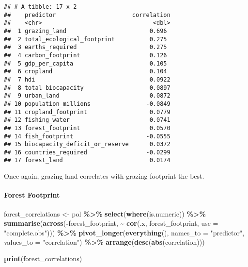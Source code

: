 \documentclass[
]{article}
\newenvironment{Shaded}{\begin{snugshade}}{\end{snugshade}}
\newcommand{\AttributeTok}[1]{\textcolor[rgb]{0.13,0.29,0.53}{#1}}
\newcommand{\FunctionTok}[1]{\textcolor[rgb]{0.13,0.29,0.53}{\textbf{#1}}}
\newcommand{\NormalTok}[1]{#1}
\newcommand{\OtherTok}[1]{\textcolor[rgb]{0.56,0.35,0.01}{#1}}
\newcommand{\SpecialCharTok}[1]{\textcolor[rgb]{0.81,0.36,0.00}{\textbf{#1}}}
\newcommand{\StringTok}[1]{\textcolor[rgb]{0.31,0.60,0.02}{#1}}
\begin{document}
\begin{verbatim}
## # A tibble: 17 x 2
##    predictor                      correlation
##    <chr>                                <dbl>
##  1 grazing_land                        0.696 
##  2 total_ecological_footprint          0.275 
##  3 earths_required                     0.275 
##  4 carbon_footprint                    0.126 
##  5 gdp_per_capita                      0.105 
##  6 cropland                            0.104 
##  7 hdi                                 0.0922
##  8 total_biocapacity                   0.0897
##  9 urban_land                          0.0872
## 10 population_millions                -0.0849
## 11 cropland_footprint                  0.0779
## 12 fishing_water                       0.0741
## 13 forest_footprint                    0.0570
## 14 fish_footprint                     -0.0555
## 15 biocapacity_deficit_or_reserve      0.0372
## 16 countries_required                 -0.0299
## 17 forest_land                         0.0174
\end{verbatim}

Once again, grazing land correlates with grazing footprint the best.

\paragraph{Forest Footprint}\label{forest-footprint}

\begin{Shaded}
\begin{Highlighting}[]
\NormalTok{forest\_correlations }\OtherTok{\textless{}{-}}\NormalTok{ pol }\SpecialCharTok{\%\textgreater{}\%}
  \FunctionTok{select}\NormalTok{(}\FunctionTok{where}\NormalTok{(is.numeric)) }\SpecialCharTok{\%\textgreater{}\%}
  \FunctionTok{summarise}\NormalTok{(}\FunctionTok{across}\NormalTok{(}\SpecialCharTok{{-}}\NormalTok{forest\_footprint, }
                   \SpecialCharTok{\textasciitilde{}} \FunctionTok{cor}\NormalTok{(.x, forest\_footprint, }\AttributeTok{use =} \StringTok{"complete.obs"}\NormalTok{))) }\SpecialCharTok{\%\textgreater{}\%}
  \FunctionTok{pivot\_longer}\NormalTok{(}\FunctionTok{everything}\NormalTok{(), }\AttributeTok{names\_to =} \StringTok{"predictor"}\NormalTok{, }\AttributeTok{values\_to =} \StringTok{"correlation"}\NormalTok{) }\SpecialCharTok{\%\textgreater{}\%}
  \FunctionTok{arrange}\NormalTok{(}\FunctionTok{desc}\NormalTok{(}\FunctionTok{abs}\NormalTok{(correlation)))}

\FunctionTok{print}\NormalTok{(forest\_correlations)}
\end{Highlighting}
\end{Shaded}
\end{document}
